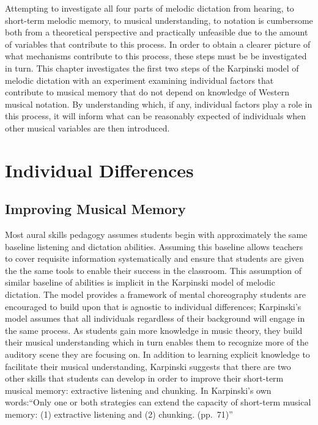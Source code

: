 \documentclass[]{book}
\begin{document}
Attempting to investigate all four parts of melodic dictation from hearing, to short-term melodic memory, to musical understanding, to notation is cumbersome both from a theoretical perspective and practically unfeasible due to the amount of variables that contribute to this process.
In order to obtain a clearer picture of what mechanisms contribute to this process, these steps must be be investigated in turn.
This chapter investigates the first two steps of the Karpinski model of melodic dictation \citep{karpinskiAuralSkillsAcquisition2000, karpinskiModelMusicPerception1990} with an experiment examining individual factors that contribute to musical memory that do not depend on knowledge of Western musical notation.
By understanding which, if any, individual factors play a role in this process, it will inform what can be reasonably expected of individuals when other musical variables are then introduced.

\hypertarget{individual-differences-1}{%
\section{Individual Differences}\label{individual-differences-1}}

\hypertarget{improving-musical-memory}{%
\subsection{Improving Musical Memory}\label{improving-musical-memory}}

Most aural skills pedagogy assumes students begin with approximately the same baseline listening and dictation abilities.
Assuming this baseline allows teachers to cover requisite information systematically and ensure that students are given the the same tools to enable their success in the classroom.
This assumption of similar baseline of abilities is implicit in the Karpinski model of melodic dictation.
The model provides a framework of mental choreography students are encouraged to build upon that is agnostic to individual differences; Karpinski's model assumes that all individuals regardless of their background will engage in the same process.
As students gain more knowledge in music theory, they build their musical understanding which in turn enables them to recognize more of the auditory scene they are focusing on.
In addition to learning explicit knowledge to facilitate their musical understanding, Karpinski suggests that there are two other skills that students can develop in order to improve their short-term musical memory: extractive listening and chunking.
In Karpinski's own words:``Only one or both strategies can extend the capacity of short-term musical memory: (1) extractive listening and (2) chunking. (pp.~71)''
\end{document}

